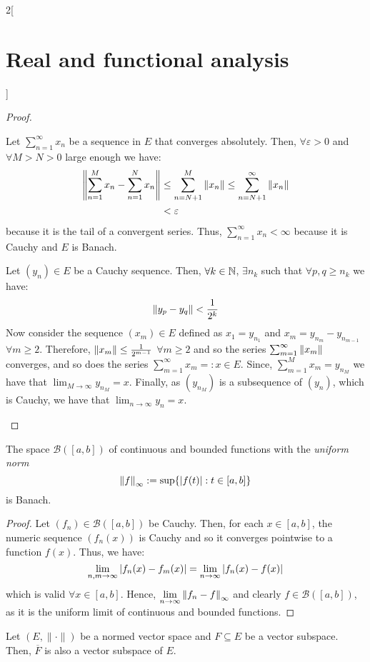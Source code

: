 \documentclass[../../../main_math.tex]{subfiles}
\begin{document}
\begin{multicols}{2}[\section{Real and functional analysis}]
\begin{theorem}
  \end{theorem}
  \begin{proof}
    \begin{itemizeiff}
      Let $\sum_{n=1}^\infty x_n$ be a sequence in $E$ that converges absolutely. Then, $\forall \varepsilon>0$ and $\forall M>N>0$ large enough we have:
      \begin{align*}
        \left\|\sum_{n=1}^M x_n-\sum_{n=1}^Nx_n\right\| & \leq \sum_{n=N+1}^M\left\|x_n\right\|\leq \sum_{n=N+1}^\infty\left\|x_n\right\| \\
                                                & <\varepsilon
      \end{align*}
      because it is the tail of a convergent series. Thus, $\sum_{n=1}^\infty x_n<\infty$ because it is Cauchy and $E$ is Banach.
      \item Let $(y_n)\in E$ be a Cauchy sequence. Then, $\forall k\in\mathbb{N}$, $\exists n_k$ such that $\forall p,q\geq n_k$ we have: $$\left\|y_p-y_q\right\|<\frac{1}{2^k}$$
      Now consider the sequence $(x_m)\in E$ defined as $x_1=y_{n_1}$ and $x_m=y_{n_m}-y_{n_{m-1}}$ $\forall m\geq 2$. Therefore, $\left\|x_m\right\|\leq \frac{1}{2^{m-1}}$ $\forall m\geq 2$ and so the series $\sum_{m=1}^\infty \left\|x_m\right\|$ converges, and so does the series $\sum_{m=1}^\infty x_m=:x\in E$. Since, $\sum_{m=1}^M x_m=y_{n_M}$ we have that $\displaystyle \lim_{M\to\infty} y_{n_M}=x$. Finally, as $(y_{n_M})$ is a subsequence of $(y_n)$, which is Cauchy, we have that $\displaystyle \lim_{n\to\infty} y_n=x$.
    \end{itemizeiff}
  \end{proof}
  \begin{proposition}
    The space $\mathcal{B}([a,b])$ of continuous and bounded functions with the \emph{uniform norm} $$\left\|f\right\|_\infty:=\sup\{\abs{f(t)}:t\in[a,b]\}$$
    is Banach.
  \end{proposition}
  \begin{proof}
    Let $(f_n)\in \mathcal{B}([a,b])$ be Cauchy. Then, for each $x\in[a,b]$, the numeric sequence $(f_n(x))$ is Cauchy and so it  converges pointwise to a function $f(x)$. Thus, we have:
    $$\lim_{n,m\to\infty}\abs{f_n(x)-f_m(x)}=\lim_{n\to\infty}\abs{f_n(x)-f(x)}$$ which is valid $\forall x\in[a,b]$. Hence, $\displaystyle\lim_{n\to\infty}\left\|f_n-f\right\|_\infty$ and clearly $f\in\mathcal{B}([a,b])$, as it is the uniform limit of continuous and bounded functions.
  \end{proof}
  \begin{proposition}\label{RFA:closurevectorsubspace}
    Let $(E,\|\cdot\|)$ be a normed vector space and $F\subseteq E$ be a vector subspace. Then, $\overline{F}$ is also a vector subspace of $E$.

\end{proposition}
\end{multicols}
\end{document}
